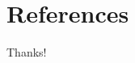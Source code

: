 \section{References}

\begin{frame}[allowframebreaks]
    
    
\end{frame}

\begin{frame}
    \begin{center}
        {\Huge\calligra Thanks!}
    \end{center}
\end{frame}
